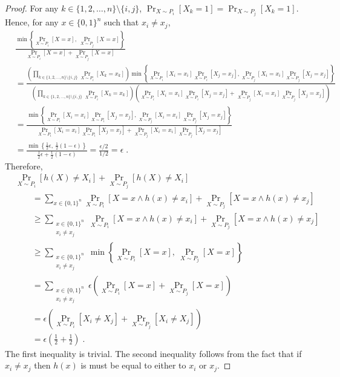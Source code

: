 \documentclass[12pt]{article}
\begin{document}
\begin{proof}
For any $k \in \{1,2,\dots,n\} \setminus \{i,j\}$, $\Pr_{X \sim P_i}[X_k = 1] = \Pr_{X \sim P_j}[X_k = 1]$.
Hence, for any $x \in \{0,1\}^n$ such that $x_i \neq x_j$,
\begin{align*}
& \frac{\displaystyle \min \left\{ \Pr_{X \sim P_i}[X = x], \ \Pr_{X \sim P_j}[X = x] \right\}}{\displaystyle \Pr_{X \sim P_i}[X = x] + \Pr_{X \sim P_j}[X = x]} \\
& =  \frac{ \displaystyle
\left( \prod_{k \in \{1,2,\dots,n\} \setminus \{i,j\}} \Pr_{X \sim P_i}[X_k = x_k] \right) \min \left\{ \Pr_{X \sim P_i}[X_i = x_i] \Pr_{X \sim P_i}[X_j = x_j], \Pr_{X \sim P_j}[X_i = x_i] \Pr_{X \sim P_j}[X_j = x_j]  \right\}
}{ \displaystyle
\left( \prod_{k \in \{1,2,\dots,n\} \setminus \{i,j\}} \Pr_{X \sim P_i}[X_k = x_k] \right) \left( \Pr_{X \sim P_i}[X_i = x_i] \Pr_{X \sim P_i}[X_j = x_j] + \Pr_{X \sim P_j}[X_i = x_i] \Pr_{X \sim P_j}[X_j = x_j]  \right)
} \\
& = \frac{ \displaystyle \min \left\{ \Pr_{X \sim P_i}[X_i = x_i] \Pr_{X \sim P_i}[X_j = x_j], \Pr_{X \sim P_j}[X_i = x_i] \Pr_{X \sim P_j}[X_j = x_j]  \right\}
}{ \displaystyle \Pr_{X \sim P_i}[X_i = x_i] \Pr_{X \sim P_i}[X_j = x_j] + \Pr_{X \sim P_j}[X_i = x_i] \Pr_{X \sim P_j}[X_j = x_j] } \\
& = \frac{ \displaystyle \min \left\{ \frac{1}{2} \epsilon, \ \frac{1}{2} (1-\epsilon) \right\}
}{ \displaystyle \frac{1}{2} \epsilon + \frac{1}{2} (1-\epsilon) } = \frac{\epsilon/2}{1/2} = \epsilon \; .
\end{align*}
Therefore,
\begin{align*}
& \Pr_{X \sim P_i}[h(X) \neq X_i] + \Pr_{X \sim P_j}[h(X) \neq X_i] \\
& \qquad = \sum_{x \in \{0,1\}^n} \Pr_{X \sim P_i}[X = x \wedge h(x) \neq x_i] + \Pr_{X \sim P_j}[X = x \wedge h(x) \neq x_j] \\
& \qquad \ge \sum_{\substack{x \in \{0,1\}^n \\ x_i \neq x_j}} \Pr_{X \sim P_i}[X = x \wedge h(x) \neq x_i] + \Pr_{X \sim P_j}[X = x \wedge h(x) \neq x_j] \\
& \qquad \ge \sum_{\substack{x \in \{0,1\}^n \\ x_i \neq x_j}} \min \left\{ \Pr_{X \sim P_i}[X = x], \ \Pr_{X \sim P_j}[X = x] \right\} \\
& \qquad = \sum_{\substack{x \in \{0,1\}^n \\ x_i \neq x_j}} \epsilon \left( \Pr_{X \sim P_i}[X = x] + \Pr_{X \sim P_j}[X = x] \right) \\
& \qquad = \epsilon \left( \Pr_{X \sim P_i}[X_i \neq X_j] + \Pr_{X \sim P_j}[X_i \neq X_j] \right) \\
& \qquad = \epsilon \left( \frac{1}{2} + \frac{1}{2} \right) \; .
\end{align*}
The first inequality is trivial. The second inequality follows from the fact that
if $x_i \neq x_j$ then $h(x)$ is must be equal to either to $x_i$ or $x_j$.
\end{proof}
\end{document}
